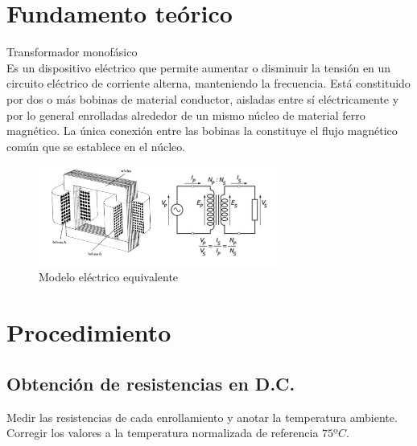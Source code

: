 \documentclass[12pt]{article}
\begin{document}
\section{Fundamento teórico}
Transformador monofásico\\
Es un dispositivo eléctrico que permite aumentar o disminuir la tensión en un circuito eléctrico de corriente alterna, manteniendo la frecuencia. Está constituido por dos o más bobinas de material conductor, aisladas entre sí eléctricamente y por lo general enrolladas alrededor de un mismo núcleo de material ferro magnético. La única conexión entre las bobinas la constituye el flujo magnético común que se establece en el núcleo.
\begin{figure}[H]
    \centering
    \includegraphics[width=0.7\textwidth]{modelo_equivalente.png}
    \captionsetup{labelformat=empty}
    \caption{Modelo eléctrico equivalente}
\end{figure}

\section{Procedimiento}

\subsection{Obtención de resistencias en D.C.}
Medir las resistencias de cada enrollamiento y anotar la temperatura ambiente. Corregir los valores a la temperatura normalizada de referencia $75ºC$.
\end{document}
